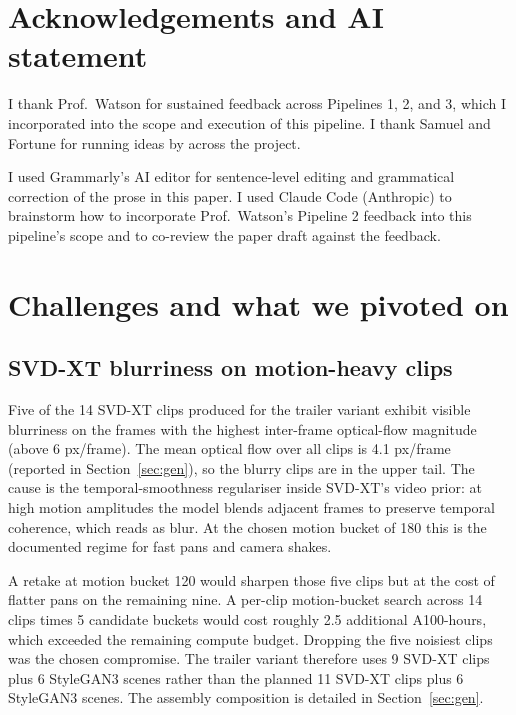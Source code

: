 \documentclass{article}
\begin{document}
\section*{Acknowledgements and AI statement}
\label{sec:ack}

I thank Prof.\ Watson for sustained feedback across Pipelines 1, 2, and 3, which I incorporated into the scope and execution of this pipeline. I thank Samuel and Fortune for running ideas by across the project.

I used Grammarly's AI editor for sentence-level editing and grammatical correction of the prose in this paper. I used Claude Code (Anthropic) to brainstorm how to incorporate Prof.\ Watson's Pipeline 2 feedback into this pipeline's scope and to co-review the paper draft against the feedback.

\appendix

\section{Challenges and what we pivoted on}
\label{sec:challenges}

\subsection{SVD-XT blurriness on motion-heavy clips}

Five of the 14 SVD-XT clips produced for the trailer variant exhibit visible blurriness on the frames with the highest inter-frame optical-flow magnitude (above 6 px/frame). The mean optical flow over all clips is 4.1 px/frame (reported in Section~\ref{sec:gen}), so the blurry clips are in the upper tail. The cause is the temporal-smoothness regulariser inside SVD-XT's video prior: at high motion amplitudes the model blends adjacent frames to preserve temporal coherence, which reads as blur. At the chosen motion bucket of 180 this is the documented regime for fast pans and camera shakes.

A retake at motion bucket 120 would sharpen those five clips but at the cost of flatter pans on the remaining nine. A per-clip motion-bucket search across 14 clips times 5 candidate buckets would cost roughly 2.5 additional A100-hours, which exceeded the remaining compute budget. Dropping the five noisiest clips was the chosen compromise. The trailer variant therefore uses 9 SVD-XT clips plus 6 StyleGAN3 scenes rather than the planned 11 SVD-XT clips plus 6 StyleGAN3 scenes. The assembly composition is detailed in Section~\ref{sec:gen}.
\end{document}
